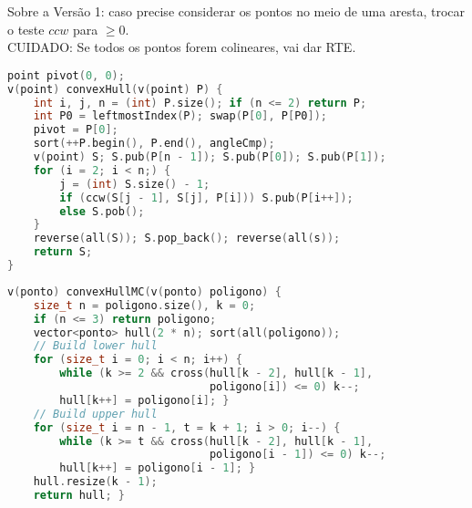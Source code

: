 Sobre a Versão 1: caso precise considerar os pontos no meio de uma aresta, trocar o teste $ccw$ para $\geq 0$.\\
CUIDADO: Se todos os pontos forem colineares, vai dar RTE.
\begin{lstlisting}[language=C++, title=Fecho Convexo - Versão 1]
point pivot(0, 0);
v(point) convexHull(v(point) P) {
	int i, j, n = (int) P.size(); if (n <= 2) return P;
	int P0 = leftmostIndex(P); swap(P[0], P[P0]);
	pivot = P[0];
	sort(++P.begin(), P.end(), angleCmp);
	v(point) S; S.pub(P[n - 1]); S.pub(P[0]); S.pub(P[1]);
	for (i = 2; i < n;) {
		j = (int) S.size() - 1;
		if (ccw(S[j - 1], S[j], P[i])) S.pub(P[i++]);
		else S.pob();
	}
	reverse(all(S)); S.pop_back(); reverse(all(s));
	return S;
}
\end{lstlisting}

\begin{lstlisting}[language=C++, title=Fecho Convexo - Versão 2 - Andrew's Monotone Chain]
v(ponto) convexHullMC(v(ponto) poligono) {
    size_t n = poligono.size(), k = 0;
	if (n <= 3) return poligono;
	vector<ponto> hull(2 * n); sort(all(poligono));
	// Build lower hull
	for (size_t i = 0; i < n; i++) {
		while (k >= 2 && cross(hull[k - 2], hull[k - 1],
		                       poligono[i]) <= 0) k--;
		hull[k++] = poligono[i]; }
	// Build upper hull
	for (size_t i = n - 1, t = k + 1; i > 0; i--) {
		while (k >= t && cross(hull[k - 2], hull[k - 1],
		                       poligono[i - 1]) <= 0) k--;
		hull[k++] = poligono[i - 1]; }
	hull.resize(k - 1);
	return hull; }
\end{lstlisting}